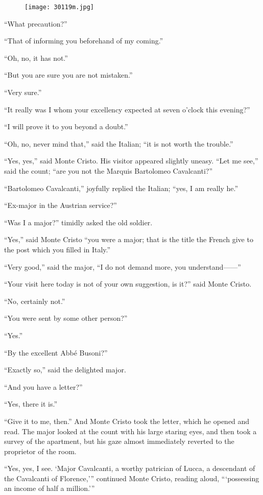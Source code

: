 \begin{figure}[ht]
\texttt{[image: 30119m.jpg]}
\end{figure}

“What precaution?”

“That of informing you beforehand of my coming.”

“Oh, no, it has not.”

“But you are sure you are not mistaken.”

“Very sure.”

“It really was I whom your excellency expected at seven o’clock this
evening?”

“I will prove it to you beyond a doubt.”

“Oh, no, never mind that,” said the Italian; “it is not worth the
trouble.”

“Yes, yes,” said Monte Cristo. His visitor appeared slightly uneasy.
“Let me see,” said the count; “are you not the Marquis Bartolomeo
Cavalcanti?”

“Bartolomeo Cavalcanti,” joyfully replied the Italian; “yes, I am
really he.”

“Ex-major in the Austrian service?”

“Was I a major?” timidly asked the old soldier.

“Yes,” said Monte Cristo “you were a major; that is the title the
French give to the post which you filled in Italy.”

“Very good,” said the major, “I do not demand more, you understand——”

“Your visit here today is not of your own suggestion, is it?” said
Monte Cristo.

“No, certainly not.”

“You were sent by some other person?”

“Yes.”

“By the excellent Abbé Busoni?”

“Exactly so,” said the delighted major.

“And you have a letter?”

“Yes, there it is.”

“Give it to me, then.” And Monte Cristo took the letter, which he
opened and read. The major looked at the count with his large staring
eyes, and then took a survey of the apartment, but his gaze almost
immediately reverted to the proprietor of the room.

“Yes, yes, I see. ‘Major Cavalcanti, a worthy patrician of Lucca, a
descendant of the Cavalcanti of Florence,’” continued Monte Cristo,
reading aloud, “‘possessing an income of half a million.’”

